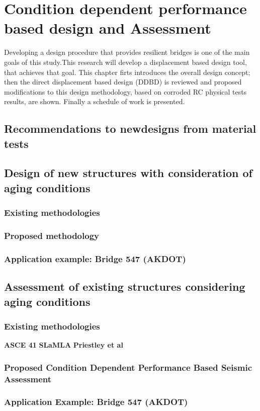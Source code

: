 \chapter{Condition dependent performance based design and Assessment}
Developing a design procedure that provides resilient bridges is one of the main goals of this study.This research will develop a displacement based design tool, that achieves that goal. This chapter firts introduces the overall design concept; then the direct displacement based design (DDBD) is reviewed and proposed modifications to this design methodology, based on corroded RC physical tests results, are shown. Finally a schedule of work is presented.

\section{Recommendations to newdesigns from material tests}
\section{Design of new structures with consideration of aging conditions}
\subsection{Existing methodologies}
\subsection{Proposed methodology}
\subsection{Application example: Bridge 547 (AKDOT)}
\section{Assessment of existing structures considering aging conditions}
\subsection{Existing methodologies}
\textbf{ASCE 41}
\textbf{SLaMLA}
\textbf{Priestley et al}
\subsection{Proposed Condition Dependent Performance Based Seismic Assessment}
\subsection{Application Example: Bridge 547 (AKDOT)}